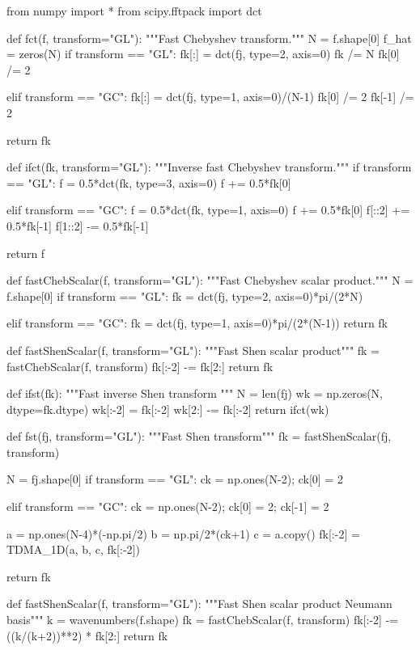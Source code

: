 \documentclass[11pt, oneside]{article}
\begin{document}
\begin{python}
from numpy import *
from scipy.fftpack import dct

def fct(f, transform="GL"):
    """Fast Chebyshev transform."""
    N = f.shape[0]
    f_hat = zeros(N)
    if transform == "GL":
        fk[:] = dct(fj, type=2, axis=0)            
        fk /= N
        fk[0] /= 2
                
    elif transform == "GC":
        fk[:] = dct(fj, type=1, axis=0)/(N-1)
        fk[0] /= 2
        fk[-1] /= 2
            
    return fk

def ifct(fk, transform="GL"):
    """Inverse fast Chebyshev transform."""
    if transform == "GL":
        f = 0.5*dct(fk, type=3, axis=0)
        f += 0.5*fk[0]
    
    elif transform == "GC":
        f = 0.5*dct(fk, type=1, axis=0)
        f += 0.5*fk[0]
        f[::2] += 0.5*fk[-1]
        f[1::2] -= 0.5*fk[-1]

    return f

def fastChebScalar(f, transform="GL"):
    """Fast Chebyshev scalar product."""
    N = f.shape[0]
    if transform == "GL":
        fk = dct(fj, type=2, axis=0)*pi/(2*N)
        
    elif transform == "GC":
        fk = dct(fj, type=1, axis=0)*pi/(2*(N-1))
    return fk

def fastShenScalar(f, transform="GL"):
    """Fast Shen scalar product"""                
    fk = fastChebScalar(f, transform)
    fk[:-2] -= fk[2:]
    return fk

def ifst(fk):
    """Fast inverse Shen transform
    """
    N = len(fj)
    wk = np.zeros(N, dtype=fk.dtype)        
    wk[:-2] = fk[:-2] 
    wk[2:] -= fk[:-2] 
    return ifct(wk)
    

def fst(fj, transform="GL"):
    """Fast Shen transform"""
    fk = fastShenScalar(fj, transform)
    
    N = fj.shape[0]
    if transform == "GL":
        ck = np.ones(N-2); ck[0] = 2
        
    elif transform == "GC":
        ck = np.ones(N-2); ck[0] = 2; ck[-1] = 2
        
    a = np.ones(N-4)*(-np.pi/2)
    b = np.pi/2*(ck+1)
    c = a.copy()
    fk[:-2] = TDMA_1D(a, b, c, fk[:-2])
        
    return fk

def fastShenScalar(f, transform="GL"):
    """Fast Shen scalar product Neumann basis"""        
    k  = wavenumbers(f.shape)
    fk = fastChebScalar(f, transform)
    fk[:-2] -= ((k/(k+2))**2) * fk[2:]
    return fk


\end{python}
\end{document}
